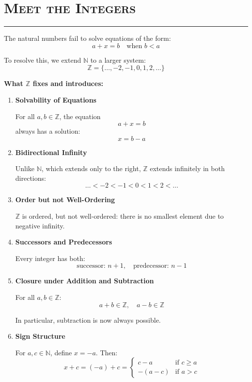 \documentclass[11pt]{article}
\newcommand{\N}{\mathbb{N}}
\newcommand{\Z}{\mathbb{Z}}
\newcommand{\sepline}{
    \vspace{0.5em}
    \hrule
    \vspace{1em}
}
\begin{document}
\section*{\textsc{Meet the Integers}}
\sepline

\begin{theorybox}

The natural numbers fail to solve equations of the form:
\[
a + x = b \quad \text{when } b < a
\]

To resolve this, we extend $\N$ to a larger system:
\[
\Z = \{\dots, -2, -1, 0, 1, 2, \dots\}
\]

\textbf{What $\Z$ fixes and introduces:}

\begin{enumerate}

\item \textbf{Solvability of Equations}

For all $a,b \in \Z$, the equation
\[
a + x = b
\]
always has a solution:
\[
x = b - a
\]

\item \textbf{Bidirectional Infinity}

Unlike $\N$, which extends only to the right, $\Z$ extends infinitely in both directions:
\[
\dots < -2 < -1 < 0 < 1 < 2 < \dots
\]

\item \textbf{Order but not Well-Ordering}

$\Z$ is ordered, but not well-ordered:
there is no smallest element due to negative infinity.

\item \textbf{Successors and Predecessors}

Every integer has both:
\[
\text{successor: } n+1, \quad \text{predecessor: } n-1
\]

\item \textbf{Closure under Addition and Subtraction}

For all $a,b \in \Z$:
\[
a + b \in \Z, \quad a - b \in \Z
\]

In particular, subtraction is now always possible.

\item \textbf{Sign Structure}

For $a,c \in \N$, define $x = -a$. Then:
\[
x + c = (-a) + c =
\begin{cases}
c - a & \text{if } c \ge a \\
-(a - c) & \text{if } a > c
\end{cases}
\]


\end{enumerate}
\end{theorybox}
\end{document}

